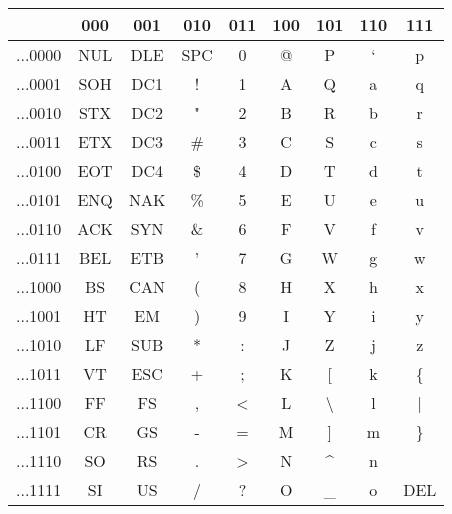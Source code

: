 \begin{table}[ht]
\centering
	\begin{tabular}{ | c | c | c | c | c | c | c | c | c | }
\hline
\rowcolor{gray!60}
	& 000 & 001 & 010 & 011 & 100 & 101 & 110 & 111 \\
\hline
	...0000 & NUL & DLE & SPC & 0 & @ & P & ` & p \\
\hline
	...0001 & SOH & DC1 & ! & 1 & A & Q & a & q \\
\hline
	...0010 & STX & DC2 & " & 2 & B & R & b & r \\
\hline
	...0011 & ETX & DC3 & \# & 3 & C & S & c & s \\
\hline
	...0100 & EOT & DC4 & \$ & 4 & D & T & d & t \\
\hline
	...0101 & ENQ & NAK & \% & 5 & E & U & e & u \\
\hline
	...0110 & ACK & SYN & \& & 6 & F & V & f & v \\
\hline
	...0111 & BEL & ETB & ' & 7 & G & W & g & w \\
\hline
	...1000 & BS & CAN & ( & 8 & H & X & h & x \\
\hline
	...1001 & HT & EM & ) & 9 & I & Y & i & y \\
\hline
	...1010 & LF & SUB & * & : & J & Z & j & z \\
\hline
	...1011 & VT & ESC & + & ; & K & [ & k & \{ \\
\hline
	...1100 & FF & FS & , & < & L & \textbackslash & l & | \\
\hline
	...1101 & CR & GS & - & = & M & ] & m & \} \\
\hline
	...1110 & SO & RS & . & > & N & \textasciicircum & n & \texttildelow \\
\hline
	...1111 & SI & US & / & ? & O & \_ & o & DEL \\
\hline
\end{tabular}
\end{table}

